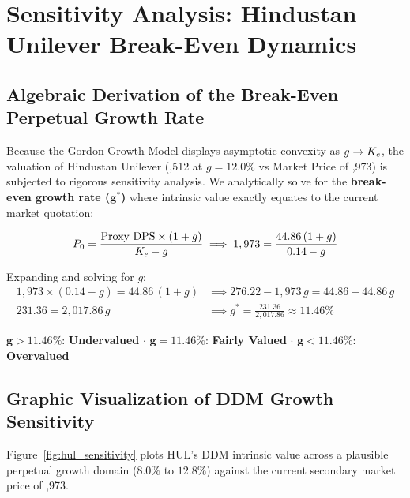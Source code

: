 
\clearpage
\section[Sensitivity Analysis]{Sensitivity Analysis: Hindustan Unilever Break-Even Dynamics}

\subsection{Algebraic Derivation of the Break-Even Perpetual Growth Rate}
Because the Gordon Growth Model displays asymptotic convexity as $g \to K_e$, the valuation of Hindustan Unilever (,512 at $g = 12.0\%$ vs Market Price of ,973) is subjected to rigorous sensitivity analysis. We analytically solve for the \textbf{break-even growth rate ($\bm{g^*}$)} where intrinsic value exactly equates to the current market quotation:

\begin{equation}
    P_0 = \frac{\text{Proxy DPS} \times (1 + g)}{K_e - g} \implies 1,973 = \frac{44.86\,(1 + g)}{0.14 - g}
\end{equation}

Expanding and solving for $g$:
\begin{align}
    1,973 \times (0.14 - g) = 44.86\,(1 + g) &\implies 276.22 - 1,973\,g = 44.86 + 44.86\,g \\
    231.36 = 2,017.86\,g &\implies g^* = \frac{231.36}{2,017.86} \approx \bm{11.46\%}
\end{align}

\begin{formulabox}
\centering\footnotesize
$\bm{g > 11.46\%}$: \textbf{Undervalued} \quad $\bm{\cdot}$ \quad
$\bm{g = 11.46\%}$: \textbf{Fairly Valued} \quad $\bm{\cdot}$ \quad
$\bm{g < 11.46\%}$: \textbf{Overvalued}
\end{formulabox}

\subsection{Graphic Visualization of DDM Growth Sensitivity}
Figure~\ref{fig:hul_sensitivity} plots HUL's DDM intrinsic value across a plausible perpetual growth domain ($8.0\%$ to $12.8\%$) against the current secondary market price of ,973.

